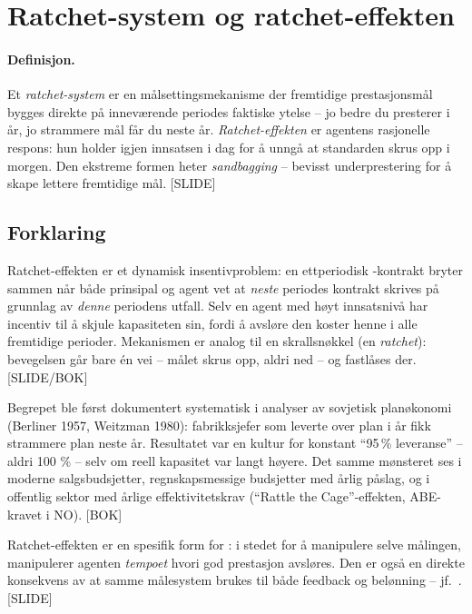 \section{Ratchet-system og ratchet-effekten}\label{thr:ratchet-effect}

\paragraph{Definisjon.} Et \emph{ratchet-system} er en målsettingsmekanisme der fremtidige prestasjonsmål bygges direkte på inneværende periodes faktiske ytelse -- jo bedre du presterer i år, jo strammere mål får du neste år. \emph{Ratchet-effekten} er agentens rasjonelle respons: hun holder igjen innsatsen i dag for å unngå at standarden skrus opp i morgen. Den ekstreme formen heter \emph{sandbagging} -- bevisst underprestering for å skape lettere fremtidige mål. [SLIDE]

\subsection*{Forklaring}

Ratchet-effekten er et dynamisk insentivproblem: en ettperiodisk -kontrakt bryter sammen når både prinsipal og agent vet at \emph{neste} periodes kontrakt skrives på grunnlag av \emph{denne} periodens utfall. Selv en agent med høyt innsatsnivå har incentiv til å skjule kapasiteten sin, fordi å avsløre den koster henne i alle fremtidige perioder. Mekanismen er analog til en skrallsnøkkel (en \emph{ratchet}): bevegelsen går bare én vei -- målet skrus opp, aldri ned -- og fastlåses der. [SLIDE/BOK]

Begrepet ble først dokumentert systematisk i analyser av sovjetisk planøkonomi (Berliner 1957, Weitzman 1980): fabrikksjefer som leverte over plan i år fikk strammere plan neste år. Resultatet var en kultur for konstant ``95\,\% leveranse'' -- aldri 100 \% -- selv om reell kapasitet var langt høyere. Det samme mønsteret ses i moderne salgsbudsjetter, regnskapsmessige budsjetter med årlig påslag, og i offentlig sektor med årlige effektivitetskrav (``Rattle the Cage''-effekten, ABE-kravet i NO). [BOK]

Ratchet-effekten er en spesifik form for : i stedet for å manipulere selve målingen, manipulerer agenten \emph{tempoet} hvori god prestasjon avsløres. Den er også en direkte konsekvens av at samme målesystem brukes til både feedback og belønning -- jf.\ . [SLIDE]

